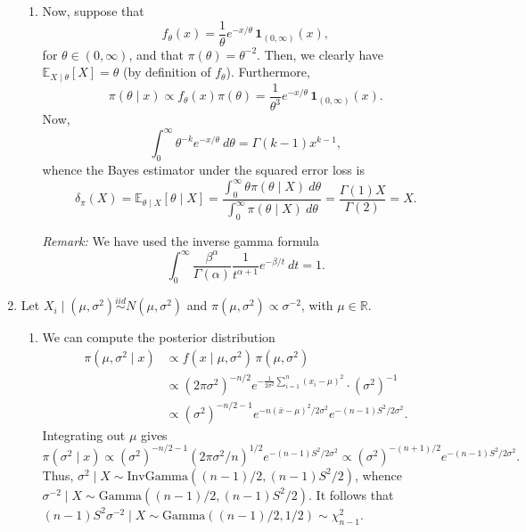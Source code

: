 \documentclass[11pt]{article}
\newcommand{\R}{\mathbb{R}}
\newcommand{\EE}{\mathbb{E}}
\begin{document}
\begin{enumerate}
\begin{enumerate}
            \item Now, suppose that \[
                f_\theta(x) = \frac{1}{\theta} e^{-x/\theta} \,\bm{1}_{(0, \infty)}(x),
            \] for $\theta \in (0, \infty)$, and that $\pi(\theta) = \theta^{-2}$.
            Then, we clearly have $\EE_{X\mid \theta}[X] = \theta$ (by
            definition of $f_\theta$).
            Furthermore, \[
                \pi(\theta\mid x)
                    \propto f_\theta(x) \pi(\theta)
                    = \frac{1}{\theta^3} e^{-x/\theta} \,\bm{1}_{(0, \infty)}(x).
            \] Now, \[
                \int_0^\infty \theta^{-k} e^{-x/\theta} \:d\theta = \Gamma(k - 1)x^{k - 1},
            \] whence the Bayes estimator under the squared error loss is \[
                \delta_\pi(X)
                    = \EE_{\theta\mid X}[\theta\mid X]
                    = \frac{\int_0^\infty \theta \pi(\theta\mid X) \:d\theta}{\int_0^\infty \pi(\theta\mid X) \:d\theta}
                    = \frac{\Gamma(1) X}{\Gamma(2)}
                    = X.
            \]

            \emph{Remark:} We have used the inverse gamma formula \[
                \int_0^\infty \frac{\beta^\alpha}{\Gamma(\alpha)} \frac{1}{t^{\alpha + 1}} e^{-\beta/t} \:dt = 1.
            \]
        \end{enumerate}


        \item Let $X_i \mid (\mu, \sigma^2) \overset{iid}{\sim} N(\mu,
        \sigma^2)$ and $\pi(\mu, \sigma^2) \propto \sigma^{-2}$, with $\mu \in
        \R$.

        \begin{enumerate}
            \item We can compute the posterior distribution \begin{align*}
                \pi(\mu, \sigma^2 \mid x)
                    &\propto f(x \mid \mu, \sigma^2)\,\pi(\mu, \sigma^2) \\
                    &\propto (2\pi\sigma^2)^{-n/2} e^{-\frac{1}{2\sigma^2} \sum_{i = 1}^n (x_i - \mu)^2} \cdot (\sigma^{2})^{-1} \\
                    &\propto (\sigma^2)^{-n/2 - 1} e^{-n(\bar{x} - \mu)^2 / 2\sigma^2} e^{-(n - 1)S^2 / 2\sigma^2}.
            \end{align*}
            Integrating out $\mu$ gives \[
                \pi(\sigma^2 \mid x)
                    \propto (\sigma^2)^{-n/2 - 1} (2\pi \sigma^2 /n)^{1/2} e^{-(n - 1)S^2 / 2\sigma^2}
                    \propto (\sigma^2)^{-(n + 1) / 2} e^{-(n - 1)S^2 / 2\sigma^2}.
            \] Thus, $\sigma^2\mid X \sim \text{InvGamma}((n - 1)/2, (n - 1)S^2/2)$,
            whence $\sigma^{-2} \mid X \sim \text{Gamma}((n - 1)/2, (n - 1)S^2/2)$.
            It follows that $(n - 1)S^2 \sigma^{-2} \mid X \sim \text{Gamma}((n
            - 1)/2, 1/2) \sim \chi^2_{n - 1}$.


\end{enumerate}
\end{enumerate}
\end{document}
